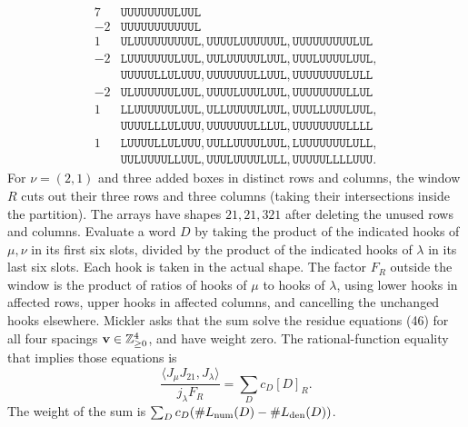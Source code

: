 \[
\begin{array}{r|l}
 7 & \mathtt{UUUUUUUULUUL}\\
-2 & \mathtt{UUUUUUUUUUUL}\\
 1 & \mathtt{ULUUUUUUUUUL},\mathtt{UUUULUUUUUUL},\mathtt{UUUUUUUUULUL}\\
-2 & \mathtt{LUUUUUUULUUL},\mathtt{UULUUUUULUUL},\mathtt{UUULUUUULUUL},\\
   & \mathtt{UUUUULLULUUU},\mathtt{UUUUUUULLUUL},\mathtt{UUUUUUUULULL}\\
-2 & \mathtt{ULUUUUUULUUL},\mathtt{UUUULUUULUUL},\mathtt{UUUUUUUULLUL}\\
 1 & \mathtt{LLUUUUUULUUL},\mathtt{ULLUUUUULUUL},\mathtt{UUULLUUULUUL},\\
   & \mathtt{UUUULLLULUUU},\mathtt{UUUUUUULLLUL},\mathtt{UUUUUUUULLLL}\\
 1 & \mathtt{LUUUULLULUUU},\mathtt{UULLUUUULUUL},\mathtt{LUUUUUUULULL},\\
   & \mathtt{UULUUUULLUUL},\mathtt{UUULUUUULULL},\mathtt{UUUUULLLLUUU}.
\end{array}
\]
For \(\nu=(2,1)\) and three added boxes in distinct rows and columns,
the window \(R\) cuts out their three rows and three columns (taking
their intersections inside the partition). The arrays have shapes
\(21,21,321\) after deleting the unused rows and columns. Evaluate a word
\(D\) by taking the product of the indicated hooks of \(\mu,\nu\)
in its first six slots, divided by the product of the indicated hooks of
\(\lambda\) in its last six slots. Each hook is taken in the actual shape.
The factor \(F_R\) outside the window is the product of ratios of hooks
of \(\mu\) to hooks of \(\lambda\), using lower hooks in affected rows,
upper hooks in affected columns, and cancelling the unchanged hooks elsewhere.
Mickler asks that the sum solve the residue equations (46) for
all four spacings \({\bf v}\in{\mathbb Z}_{\ge0}^4\), and have weight zero.
The rational-function equality that implies those equations is
\[
 \frac{\langle J_\mu J_{21},J_\lambda\rangle}{j_\lambda F_R}
    =\sum_D c_D[D]_R .
\]
The weight of the sum is
\(\sum_D c_D(\#L_{\rm num}(D)-\#L_{\rm den}(D))\).
